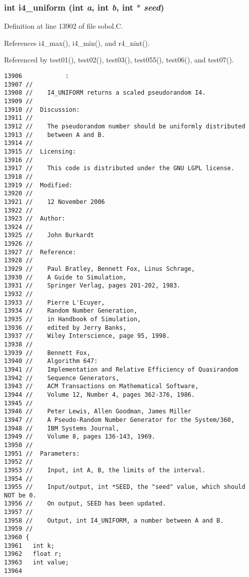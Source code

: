 \subsubsection{\setlength{\rightskip}{0pt plus 5cm}int i4\_\-uniform (int {\em a}, int {\em b}, int $\ast$ {\em seed})}\label{sobol_8C_df8800cde51ac6dd92918dc735ad2252}




Definition at line 13902 of file sobol.C.

References i4\_\-max(), i4\_\-min(), and r4\_\-nint().

Referenced by test01(), test02(), test03(), test055(), test06(), and test07().

\begin{Code}\begin{verbatim}13906            :
13907 //
13908 //    I4_UNIFORM returns a scaled pseudorandom I4.
13909 //
13910 //  Discussion:
13911 //
13912 //    The pseudorandom number should be uniformly distributed
13913 //    between A and B.
13914 //
13915 //  Licensing:
13916 //
13917 //    This code is distributed under the GNU LGPL license. 
13918 //
13919 //  Modified:
13920 //
13921 //    12 November 2006
13922 //
13923 //  Author:
13924 //
13925 //    John Burkardt
13926 //
13927 //  Reference:
13928 //
13929 //    Paul Bratley, Bennett Fox, Linus Schrage,
13930 //    A Guide to Simulation,
13931 //    Springer Verlag, pages 201-202, 1983.
13932 //
13933 //    Pierre L'Ecuyer,
13934 //    Random Number Generation,
13935 //    in Handbook of Simulation,
13936 //    edited by Jerry Banks,
13937 //    Wiley Interscience, page 95, 1998.
13938 //
13939 //    Bennett Fox,
13940 //    Algorithm 647:
13941 //    Implementation and Relative Efficiency of Quasirandom
13942 //    Sequence Generators,
13943 //    ACM Transactions on Mathematical Software,
13944 //    Volume 12, Number 4, pages 362-376, 1986.
13945 //
13946 //    Peter Lewis, Allen Goodman, James Miller
13947 //    A Pseudo-Random Number Generator for the System/360,
13948 //    IBM Systems Journal,
13949 //    Volume 8, pages 136-143, 1969.
13950 //
13951 //  Parameters:
13952 //
13953 //    Input, int A, B, the limits of the interval.
13954 //
13955 //    Input/output, int *SEED, the "seed" value, which should NOT be 0.
13956 //    On output, SEED has been updated.
13957 //
13958 //    Output, int I4_UNIFORM, a number between A and B.
13959 //
13960 {
13961   int k;
13962   float r;
13963   int value;
13964 

\end{verbatim}
\end{Code}
